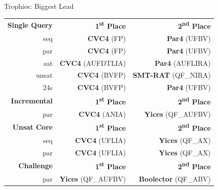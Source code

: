 \documentclass[10pt]{beamer}
\newcommand{\orange}[1]{\textcolor{mLightBrown}{#1}}
\begin{document}
  \begin{frame}{Trophies: Biggest Lead}

    \begin{tabular}{rrr}
      \hline
      \textbf{Single Query}
      & \textbf{1\textsuperscript{st} Place}
      & \textbf{2\textsuperscript{nd} Place} \\
      seq   &  \textbf{\orange{CVC4}} (FP)       &  \textbf{Par4} (UFBV) \\
      par   &  \textbf{\orange{CVC4}} (FP)       &  \textbf{Par4} (UFBV) \\
      sat   &  \textbf{\orange{CVC4}} (AUFDTLIA) &  \textbf{Par4} (AUFLIRA) \\
      unsat &  \textbf{\orange{CVC4}} (BVFP)     &  \textbf{SMT-RAT} (QF\_NIRA) \\
      24s   &  \textbf{\orange{CVC4}} (BVFP)     &  \textbf{Par4} (UFBV) \\
      \hline
      \hline

      \textbf{Incremental}
      & \textbf{1\textsuperscript{st} Place}
      & \textbf{2\textsuperscript{nd} Place} \\
      par & \textbf{\orange{CVC4}} (ANIA)  & \textbf{Yices} (QF\_AUFBV) \\
      \hline
      \hline

      \textbf{Unsat Core}
      & \textbf{1\textsuperscript{st} Place}
      & \textbf{2\textsuperscript{nd} Place} \\
      seq & \textbf{\orange{CVC4}} (UFLIA) &  \textbf{Yices} (QF\_AX) \\
      par & \textbf{\orange{CVC4}} (UFLIA) &  \textbf{Yices} (QF\_AX) \\
      \hline
      \hline

      \textbf{Challenge}
      & \textbf{1\textsuperscript{st} Place}
      & \textbf{2\textsuperscript{nd} Place} \\
      par & \textbf{\orange{Yices}} (QF\_AUFBV) & \textbf{Boolector} (QF\_ABV) \\
      \hline
    \end{tabular}
  \end{frame}
\end{document}
